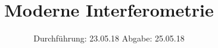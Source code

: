 

\subject{VERSUCH NUMMER 64}
\title{Moderne Interferometrie}
\date{
  Durchführung: 23.05.18
  \hspace{3em}
  Abgabe: 25.05.18
}



\maketitle
\newpage






\printbibliography


